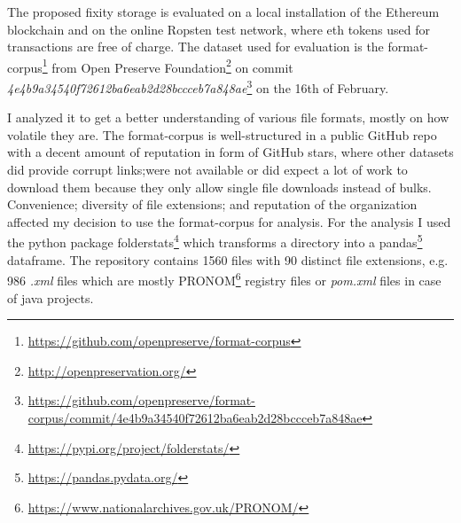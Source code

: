 The proposed fixity storage is evaluated on a local installation of the Ethereum blockchain and on the online Ropsten test network, where \acrshort{eth} tokens used for transactions are free of charge. The dataset used for evaluation is the format-corpus\footnote{\url{https://github.com/openpreserve/format-corpus}} from Open Preserve Foundation\footnote{\url{ http://openpreservation.org/}} on commit \textit{4e4b9a34540f72612ba6eab2d28bccceb7a848ae}\footnote{\url{https://github.com/openpreserve/format-corpus/commit/4e4b9a34540f72612ba6eab2d28bccceb7a848ae}} on the 16th of February.

I analyzed it to get a better understanding of various file formats, mostly on how volatile they are. The format-corpus is well-structured in a public GitHub repo with a decent amount of reputation in form of GitHub stars, where other datasets did provide corrupt links;were not available or did expect a lot of work to download them because they only allow single file downloads instead of bulks. Convenience; diversity of file extensions; and reputation of the organization affected my decision to use the format-corpus for analysis.
For the analysis I used the python package folderstats\footnote{\url{https://pypi.org/project/folderstats/}} which transforms a directory into a pandas\footnote{\url{https://pandas.pydata.org/}} dataframe. The repository contains 1560 files with 90 distinct file extensions, e.g. 986 \textit{.xml} files which are mostly PRONOM\footnote{\url{https://www.nationalarchives.gov.uk/PRONOM/}} registry files or \textit{pom.xml} files in case of java projects. 

